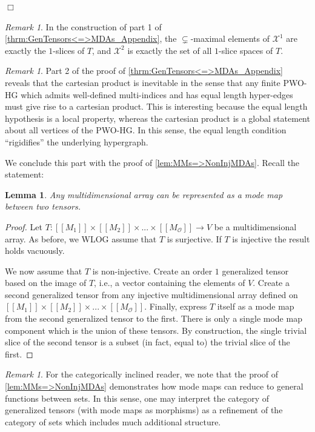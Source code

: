 \documentclass{article}
\theoremstyle{plain}
\newtheorem{lemma}[theorem]{Lemma}
\theoremstyle{definition}
\theoremstyle{remark}
\newtheorem{remark}[theorem]{Remark}
\newcommand{\cX}{\mathcal{X}}
\newcommand{\cO}{\mathcal{O}}
\begin{document}
	\label{prf:MDAs->GenTensors}
\null\hfill $\Box$

\begin{remark}
	In the construction of part 1 of \cref{thrm:GenTensors<=>MDAs_Appendix}, the $\subsetneq$-maximal elements of $\cX^1$ are exactly the $1$-slices of $T$, and $\cX^2$ is exactly the set of all $1$-slice spaces of $T$.
\end{remark}

\begin{remark}
	Part 2 of the proof of \cref{thrm:GenTensors<=>MDAs_Appendix} reveals that the cartesian product is inevitable in the sense that any finite PWO-HG which admits well-defined multi-indices and has equal length hyper-edges must give rise to a cartesian product. This is interesting because the equal length hypothesis is a local property, whereas the cartesian product is a global statement about all vertices of the PWO-HG. In this sense, the equal length condition ``rigidifies'' the underlying hypergraph.
\end{remark}
\clearpage
We conclude this part with the proof of \cref{lem:MMs=>NonInjMDAs}. Recall the statement:
\begin{lemma}
	Any multidimensional array can be represented as a mode map between two tensors.
\end{lemma}
\begin{proof}
	Let $T: [[M_1]] \times [[M_2]] \times ... \times [[M_{\cO}]] \rightarrow V$ be a multidimensional array. As before, we WLOG assume that $T$ is surjective. If $T$ is injective the result holds vacuously.
	
	We now assume that $T$ is non-injective. Create an order $1$ generalized tensor based on the image of $T$, i.e., a vector containing the elements of $V$. Create a second generalized tensor from any injective multidimensional array defined on $[[M_1]] \times [[M_2]] \times ... \times [[M_{\cO}]]$. Finally, express $T$ itself as a mode map from the second generalized tensor to the first. There is only a single mode map component which is the union of these tensors. By construction, the single trivial slice of the second tensor is a subset (in fact, equal to) the trivial slice of the first.
\end{proof}

\begin{remark}
	For the categorically inclined reader, we note that the proof of \cref{lem:MMs=>NonInjMDAs} demonstrates how mode maps can reduce to general functions between sets. In this sense, one may interpret the category of generalized tensors (with mode maps as morphisms) as a refinement of the category of sets which includes much additional structure.
\end{remark}
\end{document}
